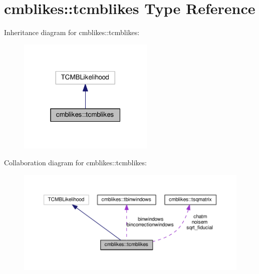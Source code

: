 \hypertarget{structcmblikes_1_1tcmblikes}{}\section{cmblikes\+:\+:tcmblikes Type Reference}
\label{structcmblikes_1_1tcmblikes}


Inheritance diagram for cmblikes\+:\+:tcmblikes\+:
\nopagebreak
\begin{figure}[H]
\begin{center}
\leavevmode
\includegraphics[width=184pt]{structcmblikes_1_1tcmblikes__inherit__graph}
\end{center}
\end{figure}


Collaboration diagram for cmblikes\+:\+:tcmblikes\+:
\nopagebreak
\begin{figure}[H]
\begin{center}
\leavevmode
\includegraphics[width=350pt]{structcmblikes_1_1tcmblikes__coll__graph}
\end{center}
\end{figure}
